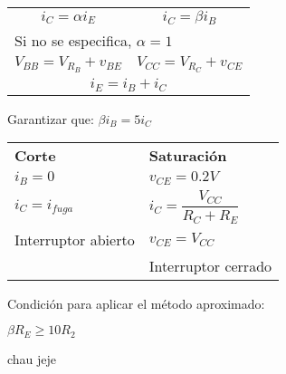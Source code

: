 \documentclass[11pt,a4paper]{article}
\begin{document}
	\begin{multicols}{2}
		\begin{cajita}
			
			
			\begin{tabular}{c c}
				$i_C = \alpha i_E$ & $i_C = \beta i_B$ \\[.1cm]
				\multicolumn{2}{l}{Si no se especifica, $\alpha = 1 $}\\[.1cm]
				$V_{BB} = V_{R_B} + v_{BE}$ & $V_{CC} = V_{R_C} + v_{CE}$ \\[.1cm]
				\multicolumn{2}{c}{$i_E = i_B + i_C$}
			\end{tabular}
		
		\vspace{-.3cm}
		
		Garantizar que: $\beta i_B = 5 i_C$\\
		
		
		\begin{tabular}{l l}
			\textbf{Corte} & \textbf{Saturación} \\[.1cm]
			$i_B = 0$ & $v_{CE} = 0.2 V$ \\[.1cm]
			$i_C = i_{fuga}$ & $i_C = \dfrac{V_{CC}}{R_C + R_E}$\\[.1cm]
			Interruptor abierto & $v_{CE} = V_{CC}$ \\[.1cm]
			& Interruptor cerrado \\
		\end{tabular}
		
		\vspace{-.8cm}
		\begin{flushleft}
			Condición para aplicar el método aproximado:
		\end{flushleft}
			
			$\beta R_E \geq 10 R_2$\\
		\end{cajita}
	
	
		\begin{cajita}
			chau jeje
		\end{cajita}
	\end{multicols}
\end{document}
